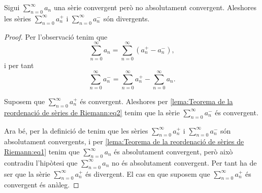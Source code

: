\documentclass[../Apunts.tex]{subfiles}
\begin{document}
	\begin{lemma}
		\label{lema:Teorema de la reordenació de sèries de Riemann}
		Sigui \(\sum_{n=0}^{\infty}a_{n}\) una sèrie convergent però no absolutament convergent. Aleshores les sèries \(\sum_{n=0}^{\infty}a^{+}_{n}\) i \(\sum_{n=0}^{\infty}a^{-}_{n}\) són divergents.
		\begin{proof}
			Per l'observació  tenim que
			\begin{equation}
				\label{lema:Teorema de la reordenació de sèries de Riemann:eq1}
				\sum_{n=0}^{\infty}a_{n}=\sum_{n=0}^{\infty}\left(a^{+}_{n}-a^{-}_{n}\right),
			\end{equation}
			i per tant
			\begin{equation}
				\label{lema:Teorema de la reordenació de sèries de Riemann:eq2}
				\sum_{n=0}^{\infty}a^{-}_{n}=\sum_{n=0}^{\infty}a^{+}_{n}-\sum_{n=0}^{\infty}a_{n}.
			\end{equation}
			
			Suposem que \(\sum_{n=0}^{\infty}a^{+}_{n}\) és convergent. Aleshores per \eqref{lema:Teorema de la reordenació de sèries de Riemann:eq2} tenim que la sèrie \(\sum_{n=0}^{\infty}a^{-}_{n}\) és convergent.
			
			Ara bé, per la definició de  tenim que les sèries \(\sum_{n=0}^{\infty}a^{+}_{n}\) i \(\sum_{n=0}^{\infty}a^{-}_{n}\) són absolutament convergents, i per \eqref{lema:Teorema de la reordenació de sèries de Riemann:eq1} tenim que \(\sum_{n=0}^{\infty}a_{n}\) és absolutament convergent, però això contradiu l'hipòtesi que \(\sum_{n=0}^{\infty}a_{n}\) no és absolutament convergent. Per tant ha de ser que la sèrie \(\sum_{n=0}^{\infty}a^{+}_{n}\) és divergent. El cas en que suposem que \(\sum_{n=0}^{\infty}a^{+}_{n}\) és convergent és anàleg.
		\end{proof}
	\end{lemma}
\end{document}
